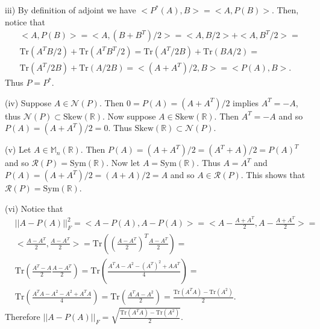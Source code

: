 \documentclass[letterpaper,12pt]{article}
\theoremstyle{definition}
\newenvironment{problem}[2][Problem]{\begin{trivlist}
\item[\hskip \labelsep {\bfseries #1}\hskip \labelsep {\bfseries #2.}]}{\end{trivlist}}
\begin{document}
\begin{problem}{48}
(iii)
By definition of adjoint we have $<P^*(A),B>=<A,P(B)>$.
Then, notice that
\begin{align*}
    &<A,P(B)>=<A,(B+B^T)/2>=
    <A,B/2>+<A,B^T/2>=\\
    &\text{Tr}(A^TB/2)+\text{Tr}(A^TB^T/2)=
    \text{Tr}(A^T/2B)+\text{Tr}(BA/2)=\\
    &\text{Tr}(A^T/2B)+\text{Tr}(A/2B)=
    <(A+A^T)/2,B>=<P(A),B>.
\end{align*}
Thus $P=P^*$.

(iv)
Suppose $A\in\mathcal N(P)$.
Then $0=P(A)=(A+A^T)/2$ implies $A^T=-A$, thus $\mathcal N(P)\subset\text{Skew}(\mathbb R)$.
Now suppose $A\in\text{Skew}(\mathbb R)$.
Then $A^T=-A$ and so $P(A)=(A+A^T)/2=0$. Thus $\text{Skew}(\mathbb R)\subset\mathcal N(P)$.

(v)
Let $A\in\mathbb M_n(\mathbb R)$.
Then $P(A)=(A+A^T)/2=(A^T+A)/2=P(A)^T$ and so $\mathcal R(P)=\text{Sym}(\mathbb R)$.
Now let $A=\text{Sym}(\mathbb R)$.
Thus $A=A^T$ and $P(A)=(A+A^T)/2=(A+A)/2=A$ and so $A\in\mathcal R(P)$.
This shows that $\mathcal R(P)=\text{Sym}(\mathbb R)$.

(vi)
Notice that
\begin{align*}
    &||A - P(A)||_F^2 = <A - P(A), A - P(A)> =
    <A - \frac{A + A^T}{2}, A - \frac{A + A^T}{2}> =\\
    &<\frac{A - A^T}{2}, \frac{A - A^T}{2}> =
    \text{Tr}\left(\left(\frac{A - A^T}{2}\right)^T\frac{A - A^T}{2}\right)=\\
    &\text{Tr}\left(\frac{A^T - A}{2}\frac{A - A^T}{2}\right) =
    \text{Tr}\left(\frac{A^TA - A^2 - (A^T)^2 + AA^T}{4}\right) =\\
    &\text{Tr}\left(\frac{A^TA - A^2 - A^2 + A^TA}{4}\right) =
    \text{Tr}\left(\frac{A^TA - A^2}{2}\right) =
    \frac{\text{Tr}(A^TA) - \text{Tr}(A^2)}{2}.
\end{align*}
Therefore $||A - P(A)||_F = \sqrt{\frac{\text{Tr}(A^TA) - \text{Tr}(A^2)}{2}}$.


\end{problem}
\end{document}
